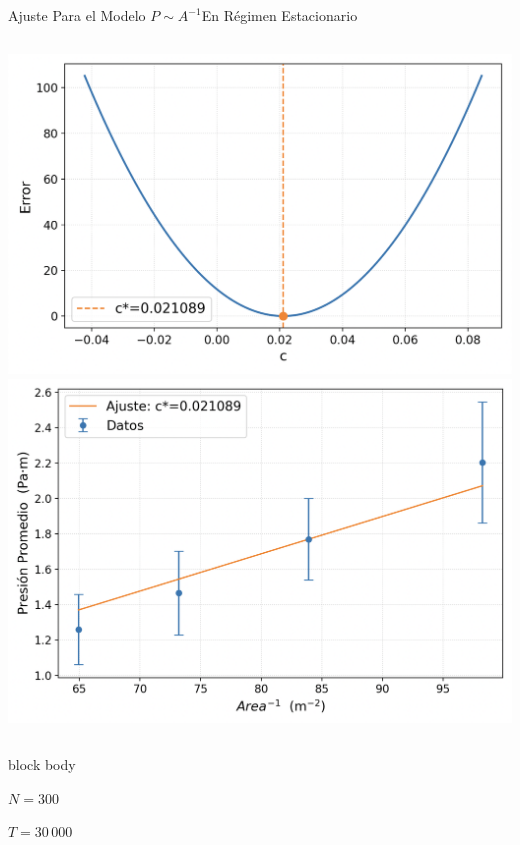 \documentclass{beamer}
\begin{document}
\begin{frame}{Ajuste Para el Modelo $P\sim A^{-1}$}{En Régimen Estacionario}
    \begin{columns}[c]
            \centering
            \includegraphics[width=\linewidth]{resources/error-regresion.png}
            \centering
            \includegraphics[width=\linewidth]{resources/regresion.png}
    \end{columns}
    \vspace{0.5cm}
    \begin{beamercolorbox}[sep=5pt,center]{block body}
        \begin{minipage}[t]{0.3\textwidth}
            \centering
            \small{$N=300$}
        \end{minipage}
        \hfill
        \begin{minipage}[t]{0.3\textwidth}
            \centering
            \small{$T=30\,000$}
        \end{minipage}
    \end{beamercolorbox}
\end{frame}
\end{document}
